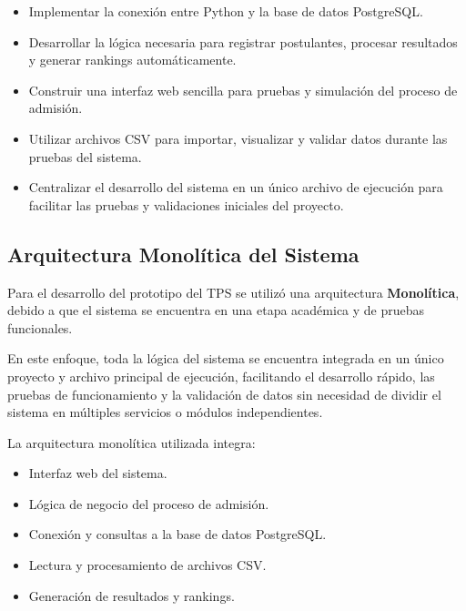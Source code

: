 \documentclass[12pt, a4paper]{report}
\begin{document}
\begin{itemize}[noitemsep]
  \item Implementar la conexión entre Python y la base de datos PostgreSQL.
  
  \item Desarrollar la lógica necesaria para registrar postulantes, procesar resultados y generar rankings automáticamente.
  
  \item Construir una interfaz web sencilla para pruebas y simulación del proceso de admisión.
  
  \item Utilizar archivos CSV para importar, visualizar y validar datos durante las pruebas del sistema.
  
  \item Centralizar el desarrollo del sistema en un único archivo de ejecución para facilitar las pruebas y validaciones iniciales del proyecto.
\end{itemize}

\subsection{Arquitectura Monolítica del Sistema}

Para el desarrollo del prototipo del TPS se utilizó una arquitectura \textbf{Monolítica}, debido a que el sistema se encuentra en una etapa académica y de pruebas funcionales.

En este enfoque, toda la lógica del sistema se encuentra integrada en un único proyecto y archivo principal de ejecución, facilitando el desarrollo rápido, las pruebas de funcionamiento y la validación de datos sin necesidad de dividir el sistema en múltiples servicios o módulos independientes.

La arquitectura monolítica utilizada integra:

\begin{itemize}[noitemsep]
  \item Interfaz web del sistema.
  
  \item Lógica de negocio del proceso de admisión.
  
  \item Conexión y consultas a la base de datos PostgreSQL.
  
  \item Lectura y procesamiento de archivos CSV.
  
  \item Generación de resultados y rankings.
\end{itemize}
\end{document}
